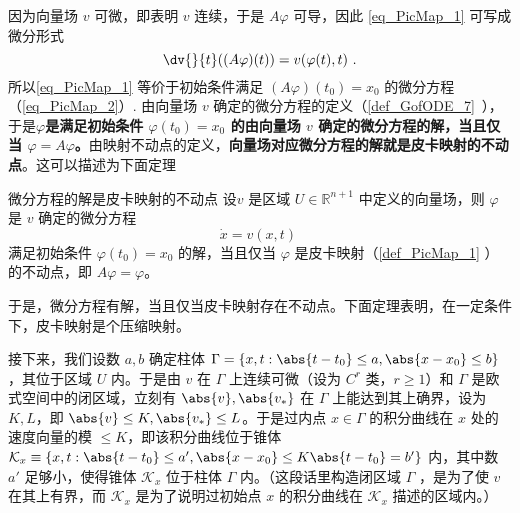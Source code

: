 因为向量场 $v$ 可微，即表明 $v$ 连续，于是 $A\varphi$ 可导，因此 \autoref{eq_PicMap_1} 可写成微分形式
\begin{equation}\label{eq_PicMap_2}
\dv{}{t}((A\varphi)(t))=v(\varphi(t),t)~.
\end{equation}
所以\autoref{eq_PicMap_1} 等价于初始条件满足 $(A\varphi)(t_0)=x_0$ 的微分方程（\autoref{eq_PicMap_2}）. 由向量场 $v$ 确定的微分方程的定义（\autoref{def_GofODE_7}~），于是\textbf{$\varphi$是满足初始条件 $\varphi(t_0)=x_0$ 的由向量场 $v$ 确定的微分方程的解，当且仅当 $\varphi=A\varphi$。}由映射不动点的定义，\textbf{向量场对应微分方程的解就是皮卡映射的不动点}。这可以描述为下面定理
\begin{theorem}{微分方程的解是皮卡映射的不动点}\label{the_PicMap_1}
设$v$ 是区域 $U\in\mathbb R^{n+1}$ 中定义的向量场，则 $\varphi$ 是 $v$ 确定的微分方程
\begin{equation}\label{eq_PicMap_3}
\dot x=v(x,t)~
\end{equation}
满足初始条件 $\varphi(t_0)=x_0$ 的解，当且仅当 $\varphi$ 是皮卡映射（\autoref{def_PicMap_1} ）的不动点，即 $A\varphi=\varphi$。
\end{theorem}
于是，微分方程有解，当且仅当皮卡映射存在不动点。下面定理表明，在一定条件下，皮卡映射是个压缩映射。

接下来，我们设数 $a,b$ 确定柱体 $\Gamma=\{x,t:\abs{t-t_0}\leq a,\abs{x-x_0}\leq b\}$，其位于区域 $U$ 内。于是由 $v$ 在 $\Gamma$ 上连续可微（设为 $C^r$ 类，$r\geq1$）和 $\Gamma$ 是欧式空间中的闭区域，立刻有 $\abs{v},\abs{v_*}$ 在 $\Gamma$ 上能达到其上确界，设为 $K,L$，即 $\abs{v}\leq K,\abs{v_*}\leq L$。于是过内点 $x\in\Gamma$ 的积分曲线在 $x$ 处的速度向量的模 $\leq K$，即该积分曲线位于锥体 $\mathcal K_x\equiv\{x,t:\abs{t-t_0}\leq a',\abs{x-x_0}\leq K\abs{t-t_0}=b'\}$ 内，其中数 $a'$ 足够小，使得锥体 $\mathcal K_x$ 位于柱体 $\Gamma$ 内。（这段话里构造闭区域 $\Gamma$ ，是为了使 $v$ 在其上有界，而 $\mathcal K_x$ 是为了说明过初始点 $x$ 的积分曲线在 $\mathcal K_x$ 描述的区域内。）

